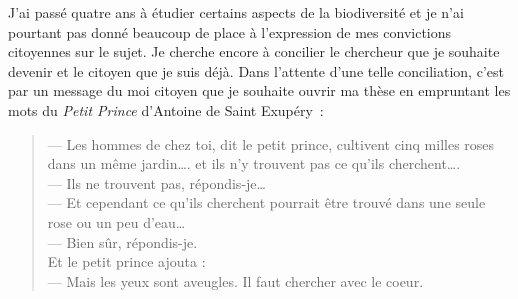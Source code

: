 J'ai passé quatre ans à étudier certains aspects de la biodiversité et
je n'ai pourtant pas donné beaucoup de place à l'expression de mes
convictions citoyennes sur le sujet. Je cherche encore à concilier le
chercheur que je souhaite devenir et le citoyen que je suis déjà. Dans
l'attente d'une telle conciliation, c'est par un message du moi citoyen
que je souhaite ouvrir ma thèse en empruntant les mots du
\textit{Petit Prince} d'Antoine de Saint Exupéry~:

\begin{quote}
--- Les hommes de chez toi, dit le petit prince, cultivent cinq milles
roses dans un même jardin\ldots{}. et ils n'y trouvent pas ce qu'ils
cherchent\ldots{}.\\
--- Ils ne trouvent pas, répondis-je\ldots{}\\
--- Et cependant ce qu'ils cherchent pourrait être trouvé dans une seule
rose ou un peu d'eau\ldots{}\\
--- Bien sûr, répondis-je.\\
Et le petit prince ajouta :\\
--- Mais les yeux sont aveugles. Il faut chercher avec le coeur.
\end{quote}
